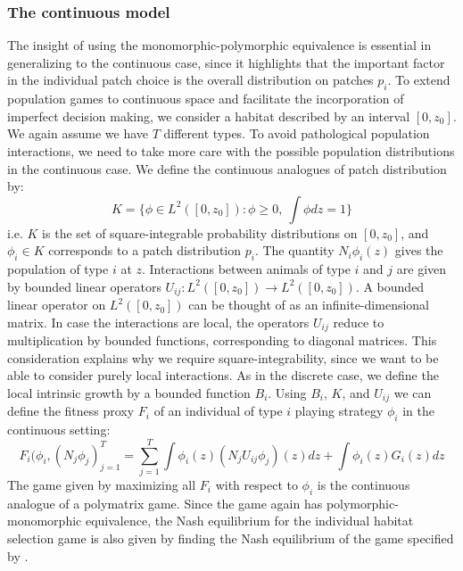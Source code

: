 \subsubsection{The continuous model}
The insight of using the monomorphic-polymorphic equivalence is essential in generalizing to the continuous case, since it highlights that the important factor in the individual patch choice  is the overall distribution on patches $p_i$. To extend population games to continuous space and facilitate the incorporation of imperfect decision making, we consider a habitat described by an interval $[0,z_0]$. We again assume we have $T$ different types. To avoid pathological population interactions, we need to take more care with the possible population distributions in the continuous case. We define the continuous analogues of patch distribution by:
\begin{equation}
  K = \{ \phi \in L^2([0,z_0]) : \phi \geq 0,~\int \phi dz = 1\}
  \label{eq:space_of_dists}
\end{equation}
i.e. $K$ is the set of square-integrable probability distributions on $[0,z_0]$, and $\phi_i \in K$ corresponds to a patch distribution $p_i$. The quantity $N_i \phi_i(z)$ gives the population of type $i$ at $z$. Interactions between animals of type $i$ and $j$ are given by bounded linear operators $U_{ij}: L^2([0,z_0]) \to L^2([0,z_0])$. A bounded linear operator on $L^2([0,z_0])$ can be thought of as an infinite-dimensional matrix. In case the interactions are local, the operators $U_{ij}$ reduce to multiplication by bounded functions, corresponding to diagonal matrices. This consideration explains why we require square-integrability, since we want to be able to consider purely local interactions. As in the discrete case, we define the local intrinsic growth by a bounded function $B_i$. Using $B_i$, $K$, and $U_{ij}$ we can define the fitness proxy $F_i$ of an individual of type $i$ playing strategy $\phi_i$ in the continuous setting:
\begin{equation}
  F_i(\phi_i, (N_j \phi_j)_{j=1}^T = \sum_{j=1}^T \int \phi_i(z) (N_j U_{ij} \phi_j)(z) dz + \int \phi_i(z) G_i(z) dz %
  \label{eq:utility}
\end{equation}
The game given by maximizing all $F_i$ with respect to $\phi_i$ is the continuous analogue of a polymatrix game. Since the game again has polymorphic-monomorphic equivalence, the Nash equilibrium for the individual habitat selection game is also given by finding the Nash equilibrium of the game specified by .

